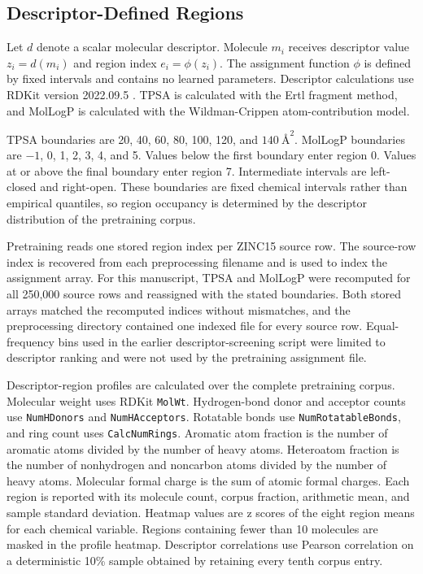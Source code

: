 \documentclass[journal=jcisd8,manuscript=article]{achemso}
\begin{document}
\subsection{Descriptor-Defined Regions}

Let \(d\) denote a scalar molecular descriptor. Molecule \(m_i\) receives descriptor value \(z_i=d(m_i)\) and region index \(e_i=\phi(z_i)\). The assignment function \(\phi\) is defined by fixed intervals and contains no learned parameters. Descriptor calculations use RDKit version 2022.09.5 \cite{RDKit2022}. TPSA is calculated with the Ertl fragment method, and MolLogP is calculated with the Wildman-Crippen atom-contribution model.

TPSA boundaries are 20, 40, 60, 80, 100, 120, and \(140\ \text{\AA}^2\). MolLogP boundaries are \(-1\), 0, 1, 2, 3, 4, and 5. Values below the first boundary enter region 0. Values at or above the final boundary enter region 7. Intermediate intervals are left-closed and right-open. These boundaries are fixed chemical intervals rather than empirical quantiles, so region occupancy is determined by the descriptor distribution of the pretraining corpus.

Pretraining reads one stored region index per ZINC15 source row. The source-row index is recovered from each preprocessing filename and is used to index the assignment array. For this manuscript, TPSA and MolLogP were recomputed for all 250,000 source rows and reassigned with the stated boundaries. Both stored arrays matched the recomputed indices without mismatches, and the preprocessing directory contained one indexed file for every source row. Equal-frequency bins used in the earlier descriptor-screening script were limited to descriptor ranking and were not used by the pretraining assignment file.

Descriptor-region profiles are calculated over the complete pretraining corpus. Molecular weight uses RDKit \texttt{MolWt}. Hydrogen-bond donor and acceptor counts use \texttt{NumH\-Donors} and \texttt{NumH\-Acceptors}. Rotatable bonds use \texttt{Num\-Rotatable\-Bonds}, and ring count uses \texttt{Calc\-Num\-Rings}. Aromatic atom fraction is the number of aromatic atoms divided by the number of heavy atoms. Heteroatom fraction is the number of nonhydrogen and noncarbon atoms divided by the number of heavy atoms. Molecular formal charge is the sum of atomic formal charges. Each region is reported with its molecule count, corpus fraction, arithmetic mean, and sample standard deviation. Heatmap values are z scores of the eight region means for each chemical variable. Regions containing fewer than 10 molecules are masked in the profile heatmap. Descriptor correlations use Pearson correlation on a deterministic 10\% sample obtained by retaining every tenth corpus entry.
\end{document}
